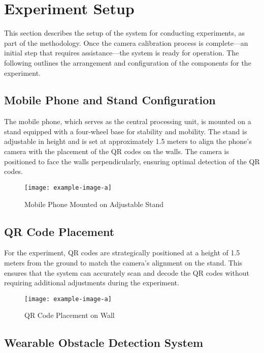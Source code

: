 \section{Experiment Setup}

This section describes the setup of the system for conducting experiments, as part of the methodology. Once the camera calibration process is complete—an initial step that requires assistance—the system is ready for operation. The following outlines the arrangement and configuration of the components for the experiment.

\subsection{Mobile Phone and Stand Configuration}

The mobile phone, which serves as the central processing unit, is mounted on a stand equipped with a four-wheel base for stability and mobility. The stand is adjustable in height and is set at approximately 1.5 meters to align the phone's camera with the placement of the QR codes on the walls. The camera is positioned to face the walls perpendicularly, ensuring optimal detection of the QR codes.

\begin{figure}[h]
	\centering
	\texttt{[image: example-image-a]}
	\caption{Mobile Phone Mounted on Adjustable Stand}
	\label{fig:camera_stand}
\end{figure}

\subsection{QR Code Placement}

For the experiment, QR codes are strategically positioned at a height of 1.5 meters from the ground to match the camera's alignment on the stand. This ensures that the system can accurately scan and decode the QR codes without requiring additional adjustments during the experiment.

\begin{figure}[h]
	\centering
	\texttt{[image: example-image-a]}
	\caption{QR Code Placement on Wall}
	\label{fig:qr_code}
\end{figure}

\subsection{Wearable Obstacle Detection System}

